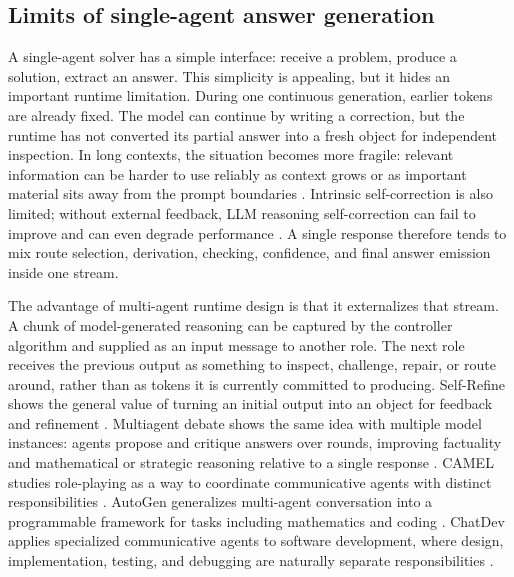 \documentclass[11pt]{article}
\begin{document}
\subsection{Limits of single-agent answer generation}

A single-agent solver has a simple interface: receive a problem, produce a solution, extract an answer. This simplicity is appealing, but it hides an important runtime limitation. During one continuous generation, earlier tokens are already fixed. The model can continue by writing a correction, but the runtime has not converted its partial answer into a fresh object for independent inspection. In long contexts, the situation becomes more fragile: relevant information can be harder to use reliably as context grows or as important material sits away from the prompt boundaries \citep{liu2024lostmiddle}. Intrinsic self-correction is also limited; without external feedback, LLM reasoning self-correction can fail to improve and can even degrade performance \citep{huang2023selfcorrect}. A single response therefore tends to mix route selection, derivation, checking, confidence, and final answer emission inside one stream.

The advantage of multi-agent runtime design is that it externalizes that stream. A chunk of model-generated reasoning can be captured by the controller algorithm and supplied as an input message to another role. The next role receives the previous output as something to inspect, challenge, repair, or route around, rather than as tokens it is currently committed to producing. Self-Refine shows the general value of turning an initial output into an object for feedback and refinement \citep{madaan2023selfrefine}. Multiagent debate shows the same idea with multiple model instances: agents propose and critique answers over rounds, improving factuality and mathematical or strategic reasoning relative to a single response \citep{du2023multiagentdebate}. CAMEL studies role-playing as a way to coordinate communicative agents with distinct responsibilities \citep{li2023camel}. AutoGen generalizes multi-agent conversation into a programmable framework for tasks including mathematics and coding \citep{wu2023autogen}. ChatDev applies specialized communicative agents to software development, where design, implementation, testing, and debugging are naturally separate responsibilities \citep{qian2023chatdev}.
\end{document}
